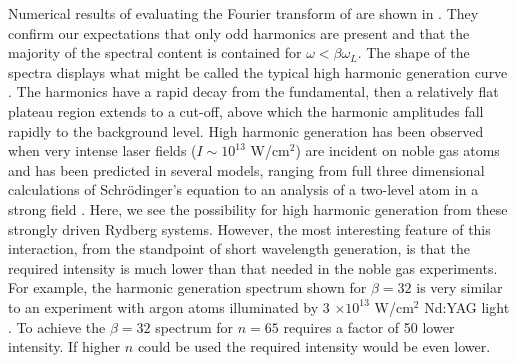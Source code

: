 Numerical results of evaluating the Fourier transform of  are
shown in .  They confirm our expectations that only odd
harmonics are present and that the majority of the spectral content is
contained for $\omega < \beta \omega_L$.  The shape of the spectra displays what
might be called the typical high harmonic generation curve \cite{Gavrila:92}. 
The harmonics have a rapid decay from the fundamental, then a relatively flat
plateau region extends to a cut-off, above which the harmonic amplitudes fall
rapidly to the background level.  High harmonic generation has been observed
when very intense laser fields ($I \sim 10^{13}$ W/cm$^2$) are incident on noble
gas atoms and has been predicted in several models, ranging from full three
dimensional calculations of Schr\"{o}dinger's equation \cite{Kulander:89} to an
analysis of a two-level atom in a strong field \cite{Sundaram:90,Burlon:96}. 
Here, we see the possibility for high harmonic generation from these strongly
driven Rydberg systems.  However, the most interesting feature of this
interaction, from the standpoint of short wavelength generation, is that the
required intensity is much lower than that needed in the noble gas experiments. 
For example, the harmonic generation spectrum shown for $\beta = 32$ is very
similar to an experiment with argon atoms illuminated by 3 $\times 10^{13}$
W/cm$^2$ Nd:YAG light \cite{Li:89}.  To achieve the $\beta=32$ spectrum for
$n=65$ requires a factor of 50 lower intensity. If higher $n$ could be used the
required intensity would be even lower. 

